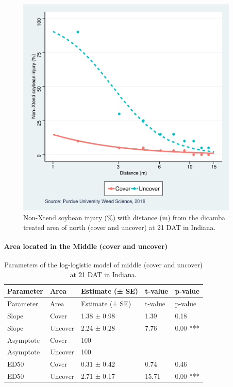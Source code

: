 \documentclass[]{article}
\let\oldparagraph\paragraph
\renewcommand{\paragraph}[1]{\oldparagraph{#1}\mbox{}}
\begin{document}
\begin{figure}
\centering
\includegraphics{Report_files/figure-latex/unnamed-chunk-30-1.pdf}
\caption{Non-Xtend soybean injury (\%) with distance (m) from the
dicamba treated area of north (cover and uncover) at 21 DAT in Indiana.}
\end{figure}

\newpage

\paragraph{\texorpdfstring{Area located in the \textbf{Middle} (cover
and
uncover)}{Area located in the Middle (cover and uncover)}}\label{area-located-in-the-middle-cover-and-uncover}

\begin{longtable}[]{@{}lllll@{}}
\caption{Parameters of the log-logistic model of middle (cover and
uncover) at 21 DAT in Indiana.}\tabularnewline
\toprule
Parameter & Area & Estimate (± SE) & t-value & p-value\tabularnewline
\midrule
\endfirsthead
\toprule
Parameter & Area & Estimate (± SE) & t-value & p-value\tabularnewline
\midrule
\endhead
Slope & Cover & 1.38 ± 0.98 & 1.39 & 0.18\tabularnewline
Slope & Uncover & 2.24 ± 0.28 & 7.76 & 0.00 ***\tabularnewline
Asymptote & Cover & 100 & &\tabularnewline
Asymptote & Uncover & 100 & &\tabularnewline
ED50 & Cover & 0.31 ± 0.42 & 0.74 & 0.46\tabularnewline
ED50 & Uncover & 2.71 ± 0.17 & 15.71 & 0.00 ***\tabularnewline
\bottomrule
\end{longtable}
\end{document}
